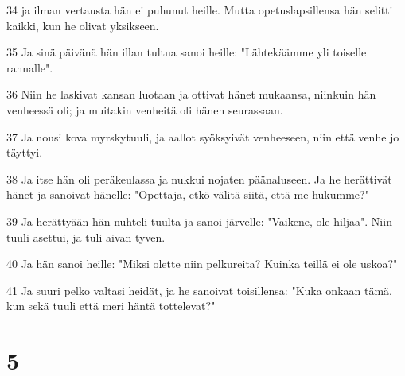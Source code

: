 \par 34 ja ilman vertausta hän ei puhunut heille. Mutta opetuslapsillensa hän selitti kaikki, kun he olivat yksikseen.
\par 35 Ja sinä päivänä hän illan tultua sanoi heille: "Lähtekäämme yli toiselle rannalle".
\par 36 Niin he laskivat kansan luotaan ja ottivat hänet mukaansa, niinkuin hän venheessä oli; ja muitakin venheitä oli hänen seurassaan.
\par 37 Ja nousi kova myrskytuuli, ja aallot syöksyivät venheeseen, niin että venhe jo täyttyi.
\par 38 Ja itse hän oli peräkeulassa ja nukkui nojaten päänaluseen. Ja he herättivät hänet ja sanoivat hänelle: "Opettaja, etkö välitä siitä, että me hukumme?"
\par 39 Ja herättyään hän nuhteli tuulta ja sanoi järvelle: "Vaikene, ole hiljaa". Niin tuuli asettui, ja tuli aivan tyven.
\par 40 Ja hän sanoi heille: "Miksi olette niin pelkureita? Kuinka teillä ei ole uskoa?"
\par 41 Ja suuri pelko valtasi heidät, ja he sanoivat toisillensa: "Kuka onkaan tämä, kun sekä tuuli että meri häntä tottelevat?"

\chapter{5}

